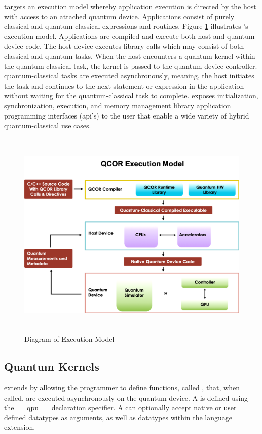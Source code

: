\qcor targets an execution model whereby application execution is directed by the host with access to an attached quantum device. Applications consist of purely classical and quantum-classical expressions and routines. Figure \ref{fig:exec_model} illustrates \qcor's execution model. Applications are compiled and execute both host and quantum device code. The host device executes \qcor library calls which may consist of both classical and quantum tasks. When the host encounters a quantum kernel within the quantum-classical task, the kernel is passed to the quantum device controller. \qcor quantum-classical tasks are executed asynchronously, meaning, the host initiates the task and continues to the next statement or expression in the application without waiting for the quantum-classical task to complete.
\qcor exposes initialization, synchronization, execution, and memory management library application programming interfaces (api's) to the user that enable a wide variety of hybrid quantum-classical use cases.

\begin{figure}
 \centering
 \includegraphics[width=5in,height=4in]{figures/Execution_Model_Illustration_v3.png}
  \caption{Diagram of \qcor Execution Model}
  \label{fig:exec_model}
\end{figure}


\subsection{\textbf{Quantum Kernels}}\label{subsec:kernel}
\qcor extends \CorCpp by allowing the programmer to define functions, called , that, when called, are executed asynchronously on the quantum device. A  is defined using the \_\_qpu\_\_ declaration specifier. A  can optionally accept native or user defined \CorCpp datatypes as arguments, as well as datatypes within the \qcor language extension.

